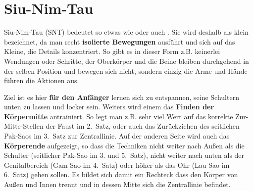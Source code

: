 %
%
		

\section{Siu-Nim-Tau}




Siu-Nim-Tau (SNT) bedeutet so etwas wie  oder auch . Sie wird deshalb als klein bezeichnet, da man recht \textbf{isolierte Bewegungen} ausf\"uhrt und sich auf das Kleine, die Details konzentriert. So gibt es in dieser Form z.B. keinerlei Wendungen oder Schritte, der Oberk\"orper und die Beine bleiben durchgehend in der selben Position und bewegen sich nicht, sondern einzig die Arme und H\"ande f\"uhren die Aktionen aus.

Ziel ist es hier \textbf{f\"ur den Anf\"anger} lernen sich zu entspannen, seine Schultern unten zu lassen und locker sein. Weiters wird einem das \textbf{Finden der K\"orpermitte} antrainiert. So legt man z.B. sehr viel Wert auf das korrekte Zur-Mitte-Stellen der Faust im 2.~Satz, oder auch das Zur\"uckziehen des seitlichen Pak-Saos im 3.~Satz zur Zentrallinie. Auf der anderen Seite wird auch das \textbf{K\"orperende} aufgezeigt, so dass die Techniken nicht weiter nach Au{\ss}en als die Schulter (seitlicher Pak-Sao im 3. und 5.~Satz), nicht weiter nach unten als der Genitalbereich (Gam-Sao im 4.~Satz) oder h\"oher als das Ohr (Lau-Sao im 6.~Satz) gehen sollen. Es bildet sich damit ein Rechteck dass den K\"orper von Au{\ss}en und Innen trennt und in dessen Mitte sich die Zentrallinie befindet.


